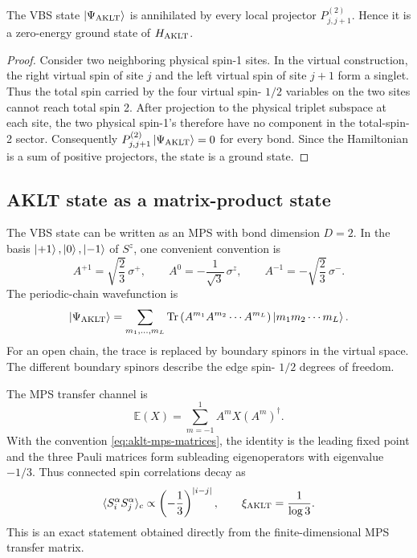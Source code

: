 \begin{proposition}
The VBS state \(\left|\Psi_{\rm AKLT}\right\rangle\) is annihilated by every local projector
\(P_{j,j+1}^{(2)}\).  Hence it is a zero-energy ground state of
\(H_{\rm AKLT}\).
\end{proposition}

\begin{proof}
Consider two neighboring physical spin-1 sites.  In the virtual construction,
the right virtual spin of site \(j\) and the left virtual spin of site \(j+1\)
form a singlet.  Thus the total spin carried by the four virtual spin-
\(1/2\) variables on the two sites cannot reach total spin 2.  After projection
to the physical triplet subspace at each site, the two physical spin-1's
therefore have no component in the total-spin-2 sector.  Consequently
\(P_{j,j+1}^{(2)}\left|\Psi_{\rm AKLT}\right\rangle=0\) for every bond.  Since the Hamiltonian
is a sum of positive projectors, the state is a ground state.
\end{proof}

\subsection{AKLT state as a matrix-product state}
\label{subsec:aklt-mps}

The VBS state can be written as an MPS with bond dimension \(D=2\).  In the
basis \(\left|+1\right\rangle,\left|0\right\rangle,\left|-1\right\rangle\) of \(S^z\), one convenient convention is
\begin{equation}
\label{eq:aklt-mps-matrices}
    A^{+1}=\sqrt{\frac23}\,\sigma^+,
    \qquad
    A^{0}=-\frac{1}{\sqrt3}\,\sigma^z,
    \qquad
    A^{-1}=-\sqrt{\frac23}\,\sigma^- .
\end{equation}
The periodic-chain wavefunction is
\begin{equation}
\label{eq:aklt-mps-periodic}
    \left|\Psi_{\rm AKLT}\right\rangle
    =
    \sum_{m_1,\ldots,m_L}
    \operatorname{Tr}\left(A^{m_1}A^{m_2}\cdots A^{m_L}\right)
    \left|m_1m_2\cdots m_L\right\rangle .
\end{equation}
For an open chain, the trace is replaced by boundary spinors in the virtual
space.  The different boundary spinors describe the edge spin-
\(1/2\) degrees of freedom.

The MPS transfer channel is
\begin{equation}
\label{eq:aklt-transfer-channel}
    \mathbb{E}(X)
    =
    \sum_{m=-1}^{1} A^m X (A^m)^\dagger .
\end{equation}
With the convention \cref{eq:aklt-mps-matrices}, the identity is the leading
fixed point and the three Pauli matrices form subleading eigenoperators with
eigenvalue \(-1/3\).  Thus connected spin correlations decay as
\begin{equation}
\label{eq:aklt-correlation-length}
    \langle S_i^\alpha S_j^\alpha\rangle_c
    \propto
    \left(-\frac13\right)^{\left|i-j\right|},
    \qquad
    \xi_{\rm AKLT}=\frac{1}{\log3} .
\end{equation}
This is an exact statement obtained directly from the finite-dimensional MPS
transfer matrix.

